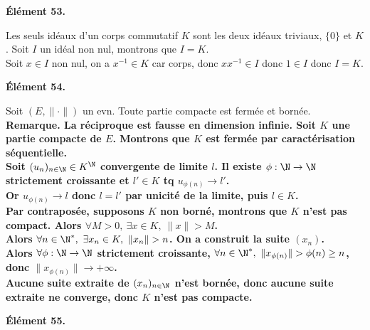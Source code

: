 \documentclass[11pt]{article}
\begin{document}
\begin{center}
    \bf{Élément 53.}
\end{center}

\begin{ex}{}{}
    Les seuls idéaux d'un corps commutatif $K$ sont les deux idéaux triviaux, $\{0\}$ et $K$.
    \tcblower
    Soit $I$ un idéal non nul, montrons que $I=K$.\\
    Soit $x\in I$ non nul, on a $x^{-1}\in K$ car corps, donc $xx^{-1}\in I$ donc $1\in I$ donc $I=K$.
\end{ex}

\begin{center}
    \bf{Élément 54.}
\end{center}

\begin{prop}{}{}
    Soit $(E,\|\cdot\|)$ un evn. Toute partie compacte est fermée et bornée.\\
    \bf{Remarque.} La réciproque est fausse en dimension infinie.
    \tcblower
    Soit $K$ une partie compacte de $E$. Montrons que $K$ est fermée par caractérisation séquentielle.\\
    Soit $(u_n)_{n\in\N}\in K^\N$ convergente de limite $l$. Il existe $\phi:\N\to\N$ strictement croissante et $l'\in K$ tq $u_{\phi(n)}\to l'$.\\
    Or $u_{\phi(n)}\to l$ donc $l=l'$ par unicité de la limite, puis $l\in K$.\\
    Par contraposée, supposons $K$ non borné, montrons que $K$ n'est pas compact. Alors $\forall M > 0, ~ \exists x \in K, ~ \|x\|>M$.\\
    Alors $\forall n \in \N^*, ~ \exists x_n \in K, ~ \|x_n\|>n$. On a construit la suite $(x_n)$.\\
    Alors $\forall \phi : \N \to \N$ strictement croissante, $\forall n \in \N^*, ~ \|x_{\phi(n)}\|>\phi(n)\geq n$, donc $\|x_{\phi(n)} \| \to +\infty$.\\
    Aucune suite extraite de $(x_n)_{n\in\N}$ n'est bornée, donc aucune suite extraite ne converge, donc $K$ n'est pas compacte.
\end{prop}

\pagebreak

\begin{center}
    \bf{Élément 55.}
\end{center}
\end{document}
